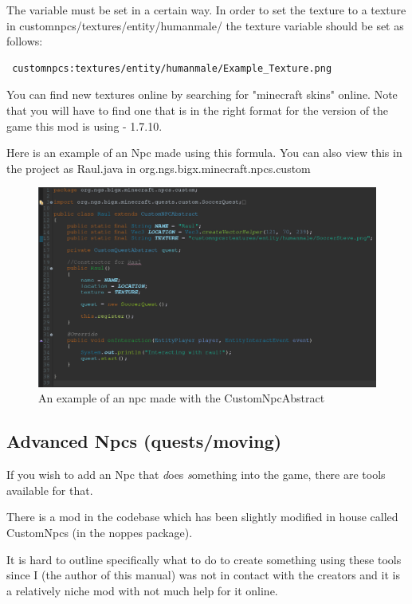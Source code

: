 \documentclass[12pt]{article}
\begin{document}
The variable must be set in a certain way. In order to set the texture to a texture in customnpcs/textures/entity/humanmale/ the texture variable should be set as follows: \begin{verbatim} customnpcs:textures/entity/humanmale/Example_Texture.png \end{verbatim}

You can find new textures online by searching for "minecraft skins" online. Note that you will have to find one that is in the right format for the version of the game this mod is using - 1.7.10.

Here is an example of an Npc made using this formula. You can also view this in the project as Raul.java in org.ngs.bigx.minecraft.npcs.custom

\begin{figure}[H]
	\caption{An example of an npc made with the CustomNpcAbstract}
	\includegraphics[scale=0.3]{images/npcs/Raul_Java.png}
	\centering
\end{figure}

\subsection{Advanced Npcs (quests/moving)}

If you wish to add an Npc that {\emph does \emph something} into the game, there are tools available for that.

There is a mod in the codebase which has been slightly modified in house called CustomNpcs (in the noppes package).

It is hard to outline specifically what to do to create something using these tools since I (the author of this manual) was not in contact with the creators and it is a relatively niche mod with not much help for it online.
\end{document}
